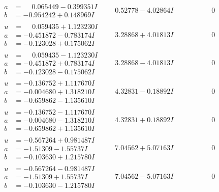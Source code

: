 \documentclass[1p]{elsarticle_modified}
\theoremstyle{definition}
\begin{document}
$$\begin{array}{c|c|c}
\begin{aligned}
a &= \phantom{-}0.065449 - 0.399351 I \\
b &= -0.954242 + 0.148969 I\end{aligned}
 & \phantom{-}0.52778 - 4.02864 I & \phantom{-0.000000 } 0 \\ \hline\begin{aligned}
u &= \phantom{-}0.059435 + 1.123230 I \\
a &= -0.451872 - 0.783174 I \\
b &= -0.123028 + 0.175062 I\end{aligned}
 & \phantom{-}3.28868 + 4.01813 I & \phantom{-0.000000 } 0 \\ \hline\begin{aligned}
u &= \phantom{-}0.059435 - 1.123230 I \\
a &= -0.451872 + 0.783174 I \\
b &= -0.123028 - 0.175062 I\end{aligned}
 & \phantom{-}3.28868 - 4.01813 I & \phantom{-0.000000 } 0 \\ \hline\begin{aligned}
u &= -0.136752 + 1.117670 I \\
a &= -0.004680 + 1.318210 I \\
b &= -0.659862 - 1.135610 I\end{aligned}
 & \phantom{-}4.32831 - 0.18892 I & \phantom{-0.000000 } 0 \\ \hline\begin{aligned}
u &= -0.136752 - 1.117670 I \\
a &= -0.004680 - 1.318210 I \\
b &= -0.659862 + 1.135610 I\end{aligned}
 & \phantom{-}4.32831 + 0.18892 I & \phantom{-0.000000 } 0 \\ \hline\begin{aligned}
u &= -0.567264 + 0.981487 I \\
a &= -1.51309 - 1.55737 I \\
b &= -0.103630 + 1.215780 I\end{aligned}
 & \phantom{-}7.04562 + 5.07163 I & \phantom{-0.000000 } 0 \\ \hline\begin{aligned}
u &= -0.567264 - 0.981487 I \\
a &= -1.51309 + 1.55737 I \\
b &= -0.103630 - 1.215780 I\end{aligned}
 & \phantom{-}7.04562 - 5.07163 I & \phantom{-0.000000 } 0 \\ \hline\begin{aligned}

\end{aligned}
\end{array}$$
\end{document}
